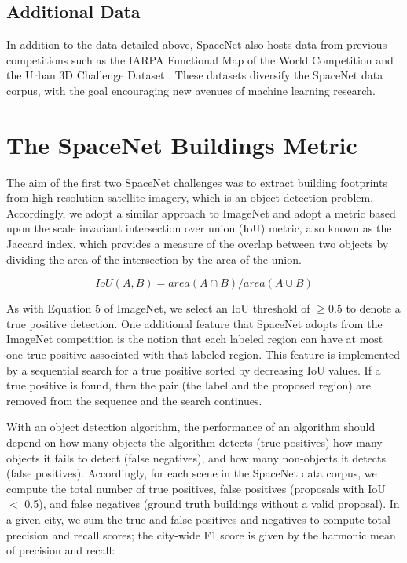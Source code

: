 \documentclass{article}
\begin{document}
\subsection{Additional Data}

In addition to the data detailed above, SpaceNet also hosts data from previous competitions such as the IARPA Functional Map of the World Competition \cite{fmow} and the Urban 3D Challenge Dataset \cite{Urban3D2017}.  These datasets diversify the SpaceNet data corpus, with the goal encouraging new avenues of machine learning research.


\section{The SpaceNet Buildings Metric}

The aim of the first two SpaceNet challenges was to extract building footprints from high-resolution satellite imagery, which is an object detection problem.  Accordingly, we adopt a similar approach to ImageNet \cite{imagenet} and adopt a metric based upon the scale invariant intersection over union (IoU) metric, also known as the Jaccard index, which provides a measure of the overlap between two objects by dividing the area of the intersection by the area of the union. 

\begin{equation}
\label{eqn:iou}
IoU(A,B) = area(A \cap B) / area( A \cup B)
\end{equation}





As with Equation 5 of ImageNet, we select an IoU threshold of $\geq 0.5$ to denote a true positive detection.  
One additional feature that SpaceNet adopts from the ImageNet competition is the notion that each labeled region can have at most one true positive associated with that labeled region. This feature is implemented by a sequential search for a true positive sorted by decreasing IoU values. If a true positive is found, then the pair (the label and the proposed region)  are removed from the sequence and the search continues. 

With an object detection algorithm, the performance of an algorithm should depend on how many objects the algorithm detects (true positives)
how many objects it fails to detect (false negatives),
and how many non-objects it detects (false positives).
Accordingly, for each scene in the SpaceNet data corpus, we compute the total number of true positives, false positives (proposals with IoU $<$ 0.5), and false negatives (ground truth buildings without a valid proposal).  In a given city, we sum the true and false positives and negatives to compute total precision and recall scores; the city-wide F1 score is given by the harmonic mean of precision and recall:
\end{document}
